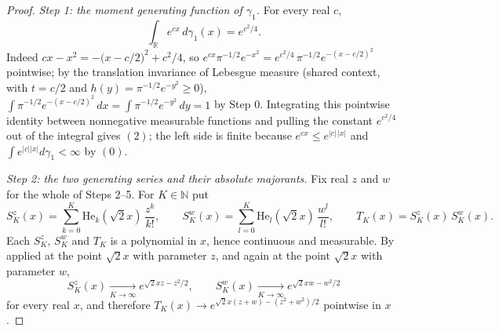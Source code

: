 \begin{proof}
\emph{Step 1: the moment generating function of $\gamma_1$.}
For every real $c$,
\begin{equation*}
  \int_{\mathbb{R}} e^{cx}\, d\gamma_1(x) = e^{c^2/4} .
  \tag{2}
\end{equation*}
Indeed $cx - x^2 = -\bigl(x - c/2\bigr)^2 + c^2/4$, so
$e^{cx}\pi^{-1/2}e^{-x^2} = e^{c^2/4}\,\pi^{-1/2}e^{-(x - c/2)^2}$ pointwise;
by the translation invariance of Lebesgue measure (shared context, with
$t = c/2$ and $h(y) = \pi^{-1/2}e^{-y^2} \geq 0$),
$\int \pi^{-1/2}e^{-(x-c/2)^2}\,dx = \int \pi^{-1/2}e^{-y^2}\,dy = 1$ by Step 0.
Integrating this pointwise identity between nonnegative measurable functions and
pulling the constant $e^{c^2/4}$ out of the integral gives $(2)$; the left side
is finite because $e^{cx} \leq e^{|c|\,|x|}$ and $\int e^{|c||x|}d\gamma_1 <
\infty$ by $(0)$.

\emph{Step 2: the two generating series and their absolute majorants.}
Fix real $z$ and $w$ for the whole of Steps 2--5.  For $K \in \mathbb{N}$ put
\[
  S_K^z(x) = \sum_{k=0}^{K} \mathrm{He}_k(\sqrt2 x)\,\frac{z^k}{k!},
  \qquad
  S_K^w(x) = \sum_{l=0}^{K} \mathrm{He}_l(\sqrt2 x)\,\frac{w^l}{l!},
  \qquad
  T_K(x) = S_K^z(x)\,S_K^w(x).
\]
Each $S_K^z$, $S_K^w$ and $T_K$ is a polynomial in $x$, hence continuous and
measurable.  By  applied at the point $\sqrt2 x$ with
parameter $z$, and again at the point $\sqrt2 x$ with parameter $w$,
\begin{equation*}
  S_K^z(x) \xrightarrow[K\to\infty]{} e^{\sqrt2 x z - z^2/2},
  \qquad
  S_K^w(x) \xrightarrow[K\to\infty]{} e^{\sqrt2 x w - w^2/2}
  \tag{3}
\end{equation*}
for every real $x$, and therefore
$T_K(x) \to e^{\sqrt2 x (z+w) - (z^2+w^2)/2}$ pointwise in $x$.


\end{proof}
